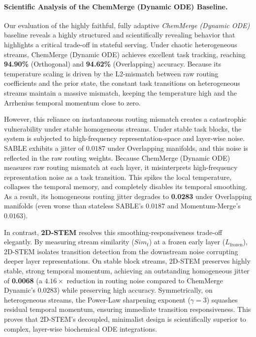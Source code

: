 \paragraph{Scientific Analysis of the ChemMerge (Dynamic ODE) Baseline.}
Our evaluation of the highly faithful, fully adaptive \emph{ChemMerge (Dynamic ODE)} baseline reveals a highly structured and scientifically revealing behavior that highlights a critical trade-off in stateful serving. Under chaotic heterogeneous streams, ChemMerge (Dynamic ODE) achieves excellent task tracking, reaching \textbf{94.90\%} (Orthogonal) and \textbf{94.62\%} (Overlapping) accuracy. Because its temperature scaling is driven by the L2-mismatch between raw routing coefficients and the prior state, the constant task transitions on heterogeneous streams maintain a massive mismatch, keeping the temperature high and the Arrhenius temporal momentum close to zero.

However, this reliance on instantaneous routing mismatch creates a catastrophic vulnerability under stable homogeneous streams. Under stable task blocks, the system is subjected to high-frequency representation-space and layer-wise noise. SABLE exhibits a jitter of $0.0187$ under Overlapping manifolds, and this noise is reflected in the raw routing weights. Because ChemMerge (Dynamic ODE) measures raw routing mismatch at each layer, it misinterprets high-frequency representation noise as a task transition. This spikes the local temperature, collapses the temporal memory, and completely disables its temporal smoothing. As a result, its homogeneous routing jitter degrades to \textbf{0.0283} under Overlapping manifolds (even worse than stateless SABLE's $0.0187$ and Momentum-Merge's $0.0163$).

In contrast, \textbf{2D-STEM} resolves this smoothing-responsiveness trade-off elegantly. By measuring stream similarity ($Sim_t$) at a frozen early layer ($L_{\text{frozen}}$), 2D-STEM isolates transition detection from the downstream noise corrupting deeper layer representations. On stable block streams, 2D-STEM preserves highly stable, strong temporal momentum, achieving an outstanding homogeneous jitter of \textbf{0.0068} (a $4.16\times$ reduction in routing noise compared to ChemMerge Dynamic's $0.0283$) while preserving high accuracy. Symmetrically, on heterogeneous streams, the Power-Law sharpening exponent ($\gamma=3$) squashes residual temporal momentum, ensuring immediate transition responsiveness. This proves that 2D-STEM's decoupled, minimalist design is scientifically superior to complex, layer-wise biochemical ODE integrations.

